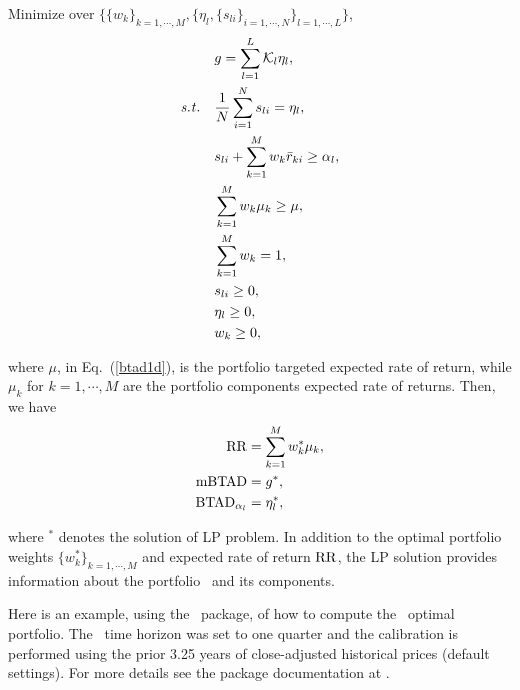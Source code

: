 \bigskip
\noindent Minimize over $\{\{w_k\}_{k=1,\cdots,M}, \{ \eta_l, \{ s_{li} \}_{i=1,\cdots,N} \}_{l=1,\cdots,L} \}$,
\begin{subequations}\label{btad1}
\begin{align}
    &g = \sum_{l=1}^L \cK_l \eta_l, \label{btad1a} \\
    \st & \frac{1}{N} \sum_{i=1}^N s_{li} = \eta_l, \label{btad1b} \\
    & s_{li} + \sum_{k=1}^M w_k \br_{ki} \geq \alpha_l, \label{btad1c} \\
    & \sum_{k=1}^M w_k \mu_k \geq \mu, \label{btad1d} \\
    & \sum_{k=1}^M w_k = 1, \label{btad1e} \\
    & s_{li} \geq 0, \label{btad1g} \\
    & \eta_l \geq 0, \label{btad1h} \\
    & w_k \geq 0, \label{btad1f}
\end{align}
\end{subequations}

\noindent where $\mu$, in Eq.~(\ref{btad1d}), is the portfolio targeted expected rate of return, while $\mu_k$ for $k = 1,\cdots,M$
are the portfolio components expected rate of returns.
Then, we have
\begin{subequations}\label{btad2}
\begin{align}
    \RR &= \sum_{k=1}^M w_k^* \mu_k, \label{btad2a} \\
    \mBTAD &= g^*, \label{btad2b} \\
    \BTAD_{\alpha_l} &= \eta_l^*, \label{btad2c}
\end{align}
\end{subequations}

\noindent where $^*$ denotes the solution of LP problem.
In addition to the optimal portfolio weights $\{w_k^*\}_{k=1,\cdots,M}$ and
expected rate of return ${\rm RR}$, the
LP solution provides information about the portfolio \mBTAD\ and its components.

\bigskip
\noindent Here is an example, using the \azapy\ package, of how to compute the \mBTAD\ optimal portfolio.
The \mBTAD\ time horizon was set to one quarter and the calibration is performed using the prior 3.25 years of
close-adjusted historical prices (default settings).
For more details see the package documentation at \azapydoc.



\BackToContents


